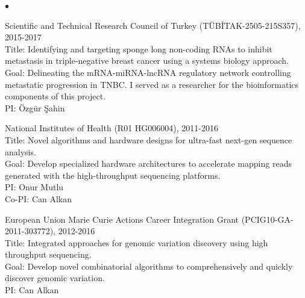 \documentclass[margin,line]{res}
\newenvironment{list2}{
  \begin{list}{$\bullet$}{%
      \setlength{\itemsep}{0.1cm}
      \setlength{\parsep}{0in} \setlength{\parskip}{0in}
      \setlength{\topsep}{0in} \setlength{\partopsep}{0in} 
      \setlength{\leftmargin}{0.2in}}}{\end{list}}
\begin{document}
\begin{resume}
\begin{list2}
                                       \item
                                         Scientific and Technical Research Council of Turkey (T\"{U}B\.{I}TAK-2505-215S357), 2015-2017\\
                                         Title: Identifying and targeting sponge long non-coding RNAs to inhibit metastasis in triple-negative breast cancer
                                         using a systems biology approach.\\
                                         Goal: Delineating the mRNA-miRNA-lncRNA regulatory network controlling metastatic progression in TNBC. I served as a researcher
                                         for the bioinformatics components of this project.\\
                                         PI: Özgür Şahin
                                       \item
                                         National Institutes of Health (R01 HG006004), 2011-2016\\
                                         Title: Novel algorithms and hardware designs for ultra-fast next-gen sequence analysis.\\
                                         Goal: Develop specialized hardware architectures to accelerate mapping reads generated with the high-throughput sequencing platforms.\\
                                         PI: Onur Mutlu\\
                                         Co-PI: Can Alkan

                                       \item
                                         European Union Marie Curie Actions Career Integration Grant (PCIG10-GA-2011-303772),  2012-2016\\
                                         Title: Integrated approaches for genomic variation discovery using high throughput sequencing.\\
                                         Goal: Develop novel combinatorial algorithms to comprehensively and quickly discover genomic variation.\\
                                         PI: Can Alkan


\end{list2}
\end{resume}
\end{document}

